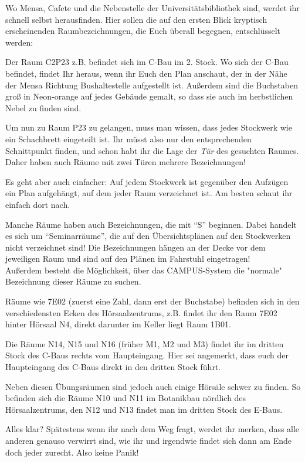 
Wo Mensa, Cafete und die Nebenstelle der Universitätsbibliothek
  sind, werdet ihr schnell selbst herausfinden.  Hier sollen die auf den
  ersten Blick kryptisch erscheinenden Raumbezeichnungen, die Euch
  überall begegnen, entschlüsselt werden:

Der Raum C2P23 z.B. befindet sich im C-Bau im 2. Stock.  Wo sich der
  C-Bau befindet, findet Ihr heraus, wenn ihr Euch den Plan anschaut,
  der in der Nähe der Mensa Richtung Bushaltestelle aufgestellt ist. 
  Außerdem sind die Buchstaben groß in Neon-orange auf jedes
  Gebäude gemalt, so dass sie auch im herbstlichen Nebel zu finden sind.

Um nun zu Raum P23 zu gelangen, muss man wissen, dass jedes Stockwerk wie
  ein Schachbrett eingeteilt ist. Ihr müsst also nur den entsprechenden
  Schnittpunkt finden, und schon habt ihr die Lage der \emph{Tür} des gesuchten
  Raumes. Daher haben auch Räume mit zwei Türen mehrere Bezeichnungen!

Es geht aber auch einfacher: Auf jedem Stockwerk ist gegenüber den
  Aufzügen ein Plan aufgehängt, auf dem jeder Raum verzeichnet ist.  Am
  besten schaut ihr einfach dort nach.

Manche Räume haben auch Bezeichnungen, die mit "`S"' beginnen. Dabei
  handelt es sich um "`Seminarräume"', die auf den Übersichtsplänen
  auf den Stockwerken nicht verzeichnet sind!  Die Bezeichnungen hängen
  an der Decke vor dem jeweiligen Raum und sind auf den Plänen im Fahrstuhl eingetragen!\\
  Außerdem besteht die Möglichkeit, über das CAMPUS-System die "normale" Bezeichnung dieser Räume zu suchen.
  
Räume wie 7E02 (zuerst eine Zahl, dann erst der Buchstabe) befinden sich in den verschiedensten Ecken
  des Hörsaalzentrums, z.B. findet ihr den Raum 7E02 hinter Hörsaal N4, direkt darunter im Keller liegt Raum 1B01.

Die Räume N14, N15 und N16 (früher M1, M2 und M3) findet ihr im dritten Stock des C-Baus rechts vom
  Haupteingang. Hier sei angemerkt, dass euch der Haupteingang des C-Baus direkt in den dritten Stock führt.

Neben diesen Übungsräumen sind jedoch auch einige Hörsäle schwer zu finden.
  So befinden sich die Räume N10 und N11 im Botanikbau nördlich des Hörsaalzentrums,
  den N12 und N13 findet man im dritten Stock des E-Baus.

Alles klar? Spätestens wenn ihr nach dem Weg fragt, werdet ihr merken, dass alle
  anderen genauso verwirrt sind, wie ihr und irgendwie findet sich dann am Ende doch
  jeder zurecht. Also keine Panik!

